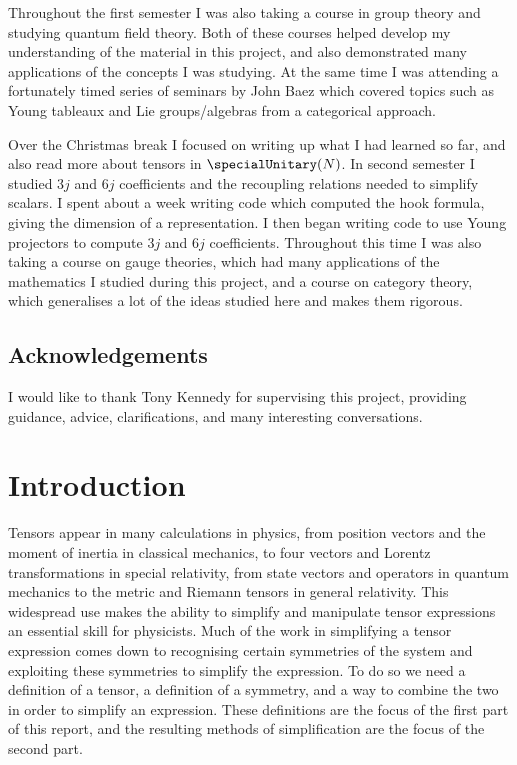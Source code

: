 \documentclass[fleqn]{NotesClass}
\begin{document}
    Throughout the first semester I was also taking a course in group theory and studying quantum field theory.
    Both of these courses helped develop my understanding of the material in this project, and also demonstrated many applications of the concepts I was studying.
    At the same time I was attending a fortunately timed series of seminars by John Baez \cite{baez} which covered topics such as Young tableaux and Lie groups/algebras from a categorical approach.
    
    Over the Christmas break I focused on writing up what I had learned so far, and also read more about tensors in \(\specialUnitary(N)\).
    In second semester I studied \(3j\) and \(6j\) coefficients and the recoupling relations needed to simplify scalars.
    I spent about a week writing code which computed the hook formula, giving the dimension of a representation.
    I then began writing code to use Young projectors to compute \(3j\) and \(6j\) coefficients.
    Throughout this time I was also taking a course on gauge theories, which had many applications of the mathematics I studied during this project, and a course on category theory, which generalises a lot of the ideas studied here and makes them rigorous.
    \section{Acknowledgements}
    I would like to thank Tony Kennedy for supervising this project, providing guidance, advice, clarifications, and many interesting conversations.
    \mainmatter
    
    \chapter{Introduction}
    Tensors appear in many calculations in physics, from position vectors and the moment of inertia in classical mechanics, to four vectors and Lorentz transformations in special relativity, from state vectors and operators in quantum mechanics to the metric and Riemann tensors in general relativity.
    This widespread use makes the ability to simplify and manipulate tensor expressions an essential skill for physicists.
    Much of the work in simplifying a tensor expression comes down to recognising certain symmetries of the system and exploiting these symmetries to simplify the expression.
    To do so we need a definition of a tensor, a definition of a symmetry, and a way to combine the two in order to simplify an expression.
    These definitions are the focus of the first part of this report, and the resulting methods of simplification are the focus of the second part.
    
\end{document}
